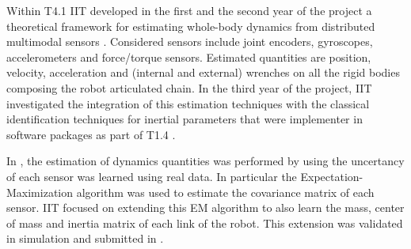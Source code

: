 
Within T4.1 IIT developed in the first and the second year of the 
project a theoretical framework for estimating whole-body
dynamics from distributed multimodal sensors \cite{nori2015}. Considered sensors
include joint encoders, gyroscopes, accelerometers and force/torque sensors.
Estimated quantities are position, velocity, acceleration and (internal and
external) wrenches on all the rigid bodies composing the robot articulated
chain. In the third year of the project, IIT investigated the integration
of this estimation techniques with the classical identification techniques
for inertial parameters that were implementer in software packages as part of T1.4 .

In \cite{nori2015}, the estimation of dynamics quantities was performed by using 
the uncertancy of each sensor  was learned using real data.
In particular the Expectation-Maximization algorithm was used to estimate the covariance matrix of 
each sensor. IIT focused on extending this EM algorithm to also learn the mass,
center of mass and inertia matrix of each link of the robot.
This extension was validated in simulation and submitted in \cite{traversaro2015parametersEM}. 
 
